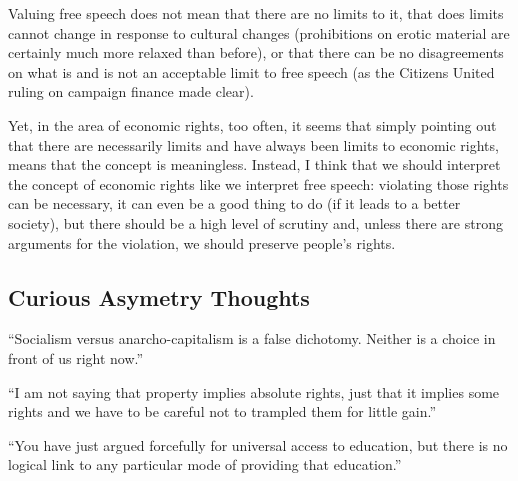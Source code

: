 Valuing free speech does not mean that there are no limits to it, that does
limits cannot change in response to cultural changes (prohibitions on erotic
material are certainly much more relaxed than before), or that there can be no
disagreements on what is and is not an acceptable limit to free speech (as the
Citizens United ruling on campaign finance made clear).

Yet, in the area of economic rights, too often, it seems that simply pointing
out that there are necessarily limits and have always been limits to economic
rights, means that the concept is meaningless. Instead, I think that we should
interpret the concept of economic rights like we interpret free speech:
violating those rights can be necessary, it can even be a good thing to do (if
it leads to a better society), but there should be a high level of scrutiny
and, unless there are strong arguments for the violation, we should preserve
people's rights.

\subsection{Curious Asymetry Thoughts}

``Socialism versus anarcho-capitalism is a false dichotomy. Neither is a choice
in front of us right now.''

``I am not saying that property implies absolute rights, just that it implies
some rights and we have to be careful not to trampled them for little gain.''

``You have just argued forcefully for universal access to education, but there
is no logical link to any particular mode of providing that education.''



